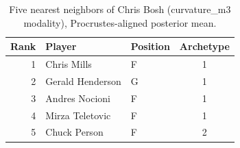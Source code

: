 \begin{table}[htbp]
  \centering\small
  \begin{tabular}{rllc}
    \toprule
    Rank & Player & Position & Archetype \\
    \midrule
    1 & Chris Mills & F & 1 \\
    2 & Gerald Henderson & G & 1 \\
    3 & Andres Nocioni & F & 1 \\
    4 & Mirza Teletovic & F & 1 \\
    5 & Chuck Person & F & 2 \\
    \bottomrule
  \end{tabular}
  \caption{Five nearest neighbors of Chris Bosh (curvature_m3 modality), Procrustes-aligned posterior mean.}
  \label{tab:Chris_Bosh_neighbors_curvature_m3}
\end{table}

